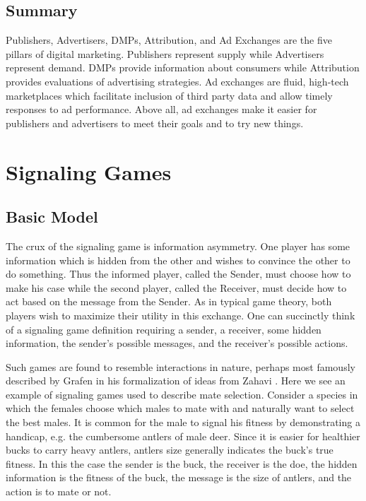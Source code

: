 \documentclass{article}
\begin{document}
\subsection{Summary}

Publishers, Advertisers, DMPs, Attribution, and Ad Exchanges are the five pillars of digital marketing. Publishers represent supply while Advertisers represent demand. DMPs provide information about consumers while Attribution provides evaluations of advertising strategies. Ad exchanges are fluid, high-tech marketplaces which facilitate inclusion of third party data and allow timely responses to ad performance. Above all, ad exchanges make it easier for publishers and advertisers to meet their goals and to try new things. 

\newpage

\section{Signaling Games}

\subsection{Basic Model}

The crux of the signaling game is information asymmetry. One player has some information which is hidden from the other and wishes to convince the other to do something. Thus the informed player, called the Sender, must choose how to make his case while the second player, called the Receiver, must decide how to act based on the message from the Sender. As in typical game theory, both players wish to maximize their utility in this exchange. One can succinctly think of a signaling game definition requiring a sender, a receiver, some hidden information, the sender's possible messages, and the receiver's possible actions.

Such games are found to resemble interactions in nature, perhaps most famously described by Grafen \cite{grafen1} in his formalization of ideas from Zahavi \cite{zahavi1}. Here we see an example of signaling games used to describe mate selection. Consider a species in which the females choose which males to mate with and naturally want to select the best males. It is common for the male to signal his fitness by demonstrating a handicap, e.g. the cumbersome antlers of male deer. Since it is easier for healthier bucks to carry heavy antlers, antlers size generally indicates the buck's true fitness. In this the case the sender is the buck, the receiver is the doe, the hidden information is the fitness of the buck, the message is the size of antlers, and the action is to mate or not. 
\end{document}
